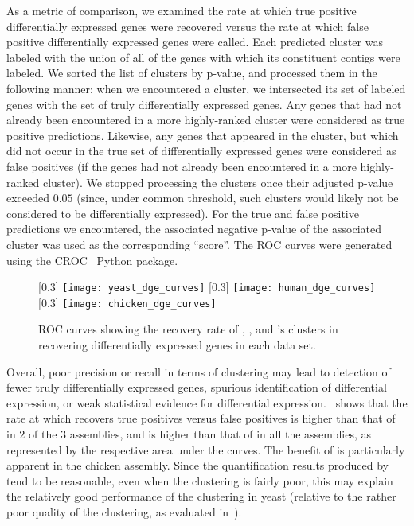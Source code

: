 As a metric of comparison, we examined the rate at which true positive differentially expressed genes were recovered versus the rate at which false positive differentially expressed genes were called. Each predicted cluster was labeled with the union of all of the genes with which its constituent contigs were labeled. We sorted the list of clusters by p-value, and processed them in the following manner: when we encountered a cluster, we intersected its set of labeled genes with the set of truly differentially expressed genes. Any genes that had not already been encountered in a more highly-ranked cluster were considered as true positive predictions. Likewise, any genes that appeared in the cluster, but which did not occur in the true set of differentially expressed genes were considered as false positives (if the genes had not already been encountered in a more highly-ranked cluster). We stopped processing the clusters once their adjusted p-value exceeded $0.05$ (since, under common threshold, such clusters would likely not be considered to be differentially expressed). For the true and false positive predictions we encountered, the associated negative p-value of the associated cluster was used as the corresponding ``score''. The ROC curves were generated using the CROC~\cite{croc} Python package.
%
\begin{figure}[thb!]
    \centering
    [0.3\textwidth]{
        \texttt{[image: yeast\_dge\_curves]}}
    [0.3\textwidth]{
        \texttt{[image: human\_dge\_curves]}}
    [0.3\textwidth]{
        \texttt{[image: chicken\_dge\_curves]}}
    \caption{ROC curves showing the recovery rate of \rapclust, \corset, and \cdhit's clusters in recovering 
        differentially expressed genes in each data set.\label{fig:ROC}}
\end{figure}

Overall, poor precision or recall in terms of clustering may lead to detection of fewer truly differentially expressed genes, spurious identification of differential expression, or weak statistical evidence for differential expression.~ shows that the rate at which \rapclust recovers true positives versus false positives is higher than that of \cdhit in $2$ of the $3$ assemblies, and is higher than that of \corset in all the assemblies, as represented by the respective area under the curves. The benefit of \rapclust is particularly apparent in the chicken assembly. Since the quantification results produced by \sailfish tend to be reasonable, even when the clustering is fairly poor, this may explain the relatively good performance of the \cdhit clustering in yeast (relative to the rather poor quality of the clustering, as evaluated in~).

